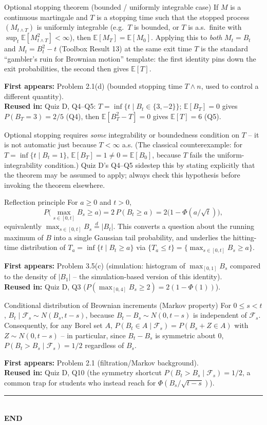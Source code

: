 \documentclass[11pt]{article}
\newcommand{\E}{\mathbb{E}}
\newcommand{\used}[2]{\begin{sourcebox}\textbf{First appears:} #1 \\ \textbf{Reused in:} #2\end{sourcebox}}
\begin{document}
\begin{result}{Optional stopping theorem (bounded / uniformly integrable case)}
\label{res:24}
If $M$ is a continuous martingale and $T$ is a stopping time such that the
stopped process $(M_{t\wedge T})$ is uniformly integrable (e.g.\ $T$ is bounded,
or $T$ is a.s.\ finite with $\sup_t\E[M_{t\wedge T}^2]<\infty$), then
$\E[M_T]=\E[M_0]$. Applying this to \emph{both} $M_t=B_t$ and $M_t=B_t^2-t$
(Toolbox Result 13) at the same exit time $T$ is the standard ``gambler's ruin
for Brownian motion'' template: the first identity pins down the exit
probabilities, the second then gives $\E[T]$.
\end{result}
\used{Problem 2.1(d) (bounded stopping time $T\wedge n$, used to control a
different quantity).}{Quiz D, Q4--Q5: $T=\inf\{t\mid B_t\in\{3,-2\}\}$;
$\E[B_T]=0$ gives $P(B_T=3)=2/5$ (Q4), then $\E[B_T^2-T]=0$ gives $\E[T]=6$
(Q5).}

\begin{trap}
Optional stopping requires \emph{some} integrability or boundedness condition on
$T$ -- it is not automatic just because $T<\infty$ a.s. (The classical
counterexample: for $T=\inf\{t\mid B_t=1\}$, $\E[B_T]=1\ne0=\E[B_0]$, because
$T$ fails the uniform-integrability condition.) Quiz D's Q4--Q5 sidestep this by
stating explicitly that the theorem may be assumed to apply; always check this
hypothesis before invoking the theorem elsewhere.
\end{trap}

\begin{result}{Reflection principle}
\label{res:25}
For $a\ge0$ and $t>0$,
\[
P\Big(\max_{s\in[0,t]}B_s\ge a\Big)=2\,P(B_t\ge a)=2\big(1-\Phi(a/\sqrt t)\big),
\]
equivalently $\max_{s\in[0,t]}B_s\overset d=|B_t|$. This converts a question
about the running maximum of $B$ into a single Gaussian tail probability, and
underlies the hitting-time distribution of $T_a=\inf\{t\mid B_t\ge a\}$ via
$\{T_a\le t\}=\{\max_{s\in[0,t]}B_s\ge a\}$.
\end{result}
\used{Problem 3.5(c) (simulation: histogram of $\max_{[0,1]}B_s$ compared to the
density of $|B_1|$ -- the simulation-based version of this identity).}{Quiz D,
Q3 ($P(\max_{[0,4]}B_s\ge2)=2(1-\Phi(1))$).}

\begin{result}{Conditional distribution of Brownian increments (Markov
property)}
\label{res:26}
For $0\le s<t$, $B_t\mid\mathcal F_s\sim N(B_s,t-s)$, because
$B_t-B_s\sim N(0,t-s)$ is independent of $\mathcal F_s$. Consequently, for any
Borel set $A$, $P(B_t\in A\mid\mathcal F_s)=P(B_s+Z\in A)$ with $Z\sim
N(0,t-s)$ -- in particular, since $B_t-B_s$ is symmetric about $0$,
$P(B_t>B_s\mid\mathcal F_s)=1/2$ regardless of $B_s$.
\end{result}
\used{Problem 2.1 (filtration/Markov background).}{Quiz D, Q10 (the symmetry
shortcut $P(B_t>B_s\mid\mathcal F_s)=1/2$, a common trap for students who
instead reach for $\Phi(B_s/\sqrt{t-s})$).}

\vspace{8pt}
\begin{center}\rule{0.5\textwidth}{0.4pt}\\[2pt]\textbf{END}\end{center}
\end{document}
